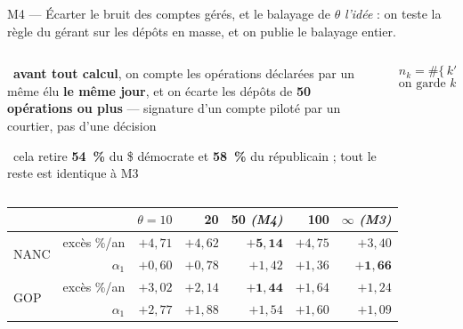\documentclass[11pt,aspectratio=169]{beamer}
\newcommand{\obs}[1]{{\color{bleu}\scriptsize\textbullet}~{\scriptsize #1}\par\vspace{0.4mm}}
\newcommand{\lire}[1]{{\scriptsize\color{grisf}#1}}
\begin{document}
\begin{frame}{M4 --- Écarter le bruit des comptes gérés, et le balayage de $\theta$}
  \lire{\emph{l'idée} : on teste la règle du gérant sur les dépôts en masse, et on publie le
   balayage entier.}
  \par\vspace{1.5mm}
  \begin{columns}[T]
    \begin{column}{0.46\textwidth}
      \obs{\textbf{avant tout calcul}, on compte les opérations déclarées par un même élu
       \textbf{le même jour}, et on écarte les dépôts de \textbf{50 opérations ou plus} ---
       signature d'un compte piloté par un courtier, pas d'une décision}
      \vspace{0.5mm}
      \obs{cela retire \textbf{54~\%} du \$ démocrate et \textbf{58~\%} du républicain ; tout le
       reste est identique à M3}
    \end{column}
    \begin{column}{0.52\textwidth}
      {\footnotesize\[ n_k = \#\{\, k' :\ m_{k'} = m_k,\ \delta_{k'} = \delta_k \,\} \]}
      \vspace{-1mm}
      {\footnotesize\[ \text{on garde } k \ \text{ si } \ n_k < \theta = 50 \]}
    \end{column}
  \end{columns}
  \par\vspace{1mm}
  \centering
  {\scriptsize\setlength{\tabcolsep}{6pt}
  \begin{tabular}{@{}l r r r r r r@{}}
    \toprule
    & & $\theta = 10$ & 20 & \textbf{50} \emph{(M4)} & 100 & $\infty$ \emph{(M3)}\\
    \midrule
    \multirow{2}{*}{NANC} & excès \%/an & $+4{,}71$ & $+4{,}62$ & $\mathbf{+5{,}14}$ & $+4{,}75$ & $+3{,}40$\\
    & $\alpha_1$ & $+0{,}60$ & $+0{,}78$ & $+1{,}42$ & $+1{,}36$ & $\mathbf{+1{,}66}$\\
    \midrule
    \multirow{2}{*}{GOP} & excès \%/an & $+3{,}02$ & $+2{,}14$ & $\mathbf{+1{,}44}$ & $+1{,}64$ & $+1{,}24$\\
    & $\alpha_1$ & $+2{,}77$ & $+1{,}88$ & $+1{,}54$ & $+1{,}60$ & $+1{,}09$\\
    \bottomrule
  \end{tabular}}

\end{frame}
\end{document}
